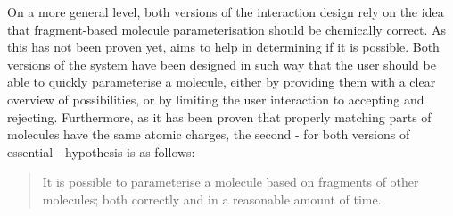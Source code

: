 On a more general level, both versions of the interaction design rely on the idea that fragment-based molecule parameterisation should be chemically correct. As this has not been proven yet, \oframp{} aims to help in determining if it is possible. Both versions of the system have been designed in such way that the user should be able to quickly parameterise a molecule, either by providing them with a clear overview of possibilities, or by limiting the user interaction to accepting and rejecting. Furthermore, as it has been proven that properly matching parts of molecules have the same atomic charges, the second - for both versions of \oframp{} essential - hypothesis is as follows:
\begin{quote}
It is possible to parameterise a molecule based on fragments of other molecules; both correctly and in a reasonable amount of time.
\end{quote}
